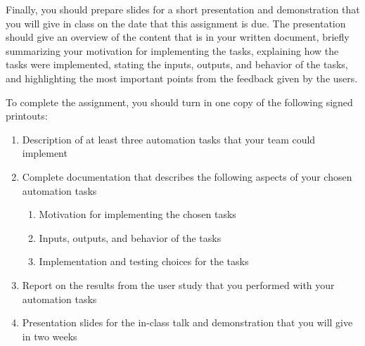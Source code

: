 Finally, you should prepare slides for a short presentation and demonstration that you will give in class on the date
that this assignment is due.  The presentation should give an overview of the content that is in your written document,
briefly summarizing your motivation for implementing the tasks, explaining how the tasks were implemented, stating the inputs,
outputs, and behavior of the tasks, and highlighting the most important points from the feedback given by the users.


\noindent
To complete the assignment, you should turn in one copy of the following signed printouts: 
\vspace*{-.1in}
\begin{enumerate}
    \itemsep0em

	\item Description of at least three automation tasks that your team could implement
		
	\item Complete documentation that describes the following aspects of your chosen automation tasks

\vspace*{-.05in}
\begin{enumerate}
	\item Motivation for implementing the chosen tasks
	\item Inputs, outputs, and behavior of the tasks
	\item Implementation and testing choices for the tasks
\end{enumerate}
\vspace*{-.05in}

	\item Report on the results from the user study that you performed with your automation tasks

	\item Presentation slides for the in-class talk and demonstration that you will give in two weeks

\end{enumerate}


